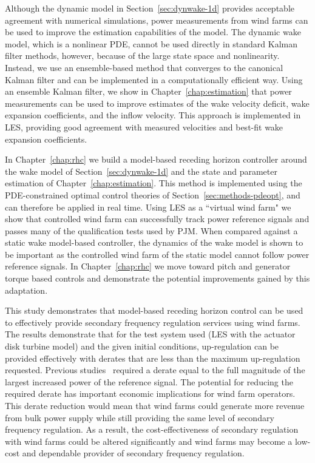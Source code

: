 Although the dynamic model in Section~\ref{sec:dynwake-1d} provides acceptable agreement with numerical simulations, power measurements from wind farms can be used to improve the estimation capabilities of the model. The dynamic wake model, which is a nonlinear PDE, cannot be used directly in standard Kalman filter methods, however, because of the large state space and nonlinearity. Instead, we use an ensemble-based method that converges to the canonical Kalman filter and can be implemented in a computationally efficient way. Using an ensemble Kalman filter, we show in Chapter~\ref{chap:estimation} that power measurements can be used to improve estimates of the wake velocity deficit, wake expansion coefficients, and the inflow velocity. This approach is implemented in LES, providing good agreement with measured velocities and best-fit wake expansion coefficients.

In Chapter~\ref{chap:rhc} we build a model-based receding horizon controller around the wake model of Section~\ref{sec:dynwake-1d} and the state and parameter estimation of Chapter~\ref{chap:estimation}. This method is implemented using the PDE-constrained optimal control theories of Section~\ref{sec:methods-pdeopt}, and can therefore be applied in real time. Using LES as a ``virtual wind farm" we show that controlled wind farm can successfully track power reference signals and passes many of the qualification tests used by PJM. When compared against a static wake model-based controller, the dynamics of the wake model is shown to be important as the controlled wind farm of the static model cannot follow power reference signals. In Chapter~\ref{chap:rhc} we move toward pitch and generator torque based controls and demonstrate the potential improvements gained by this adaptation.

This study demonstrates that model-based receding horizon control can be used to effectively provide secondary frequency regulation services using wind farms. The results demonstrate that for the test system used (LES with the actuator disk turbine model) and the given initial conditions, up-regulation can be provided effectively with derates that are less than the maximum up-regulation requested. Previous studies~\cite{Aho2013a, Aho2014a, Jeong2014a} required a derate equal to the full magnitude of the largest increased power of the reference signal. The potential for reducing the required derate has important economic implications for wind farm operators. This derate reduction would mean that wind farms could generate more revenue from bulk power supply while still providing the same level of secondary frequency regulation. As a result, the cost-effectiveness of secondary regulation with wind farms could be altered significantly and wind farms may become a low-cost and dependable provider of secondary frequency regulation.

